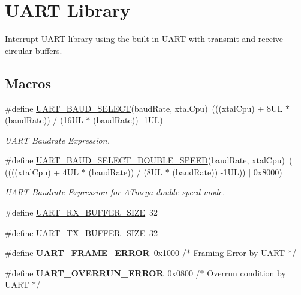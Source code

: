\hypertarget{group__pfleury__uart}{}\section{U\+A\+RT Library}
\label{group__pfleury__uart}


Interrupt U\+A\+RT library using the built-\/in U\+A\+RT with transmit and receive circular buffers.  


\subsection*{Macros}
\begin{DoxyCompactItemize}
\item 
\#define \hyperlink{group__pfleury__uart_ga367ff7b5de225ed936a63239ad4adb0b}{U\+A\+R\+T\+\_\+\+B\+A\+U\+D\+\_\+\+S\+E\+L\+E\+CT}(baud\+Rate,  xtal\+Cpu)~(((xtal\+Cpu) + 8\+U\+L $\ast$ (baud\+Rate)) / (16\+U\+L $\ast$ (baud\+Rate)) -\/1\+U\+L)
\begin{DoxyCompactList}\small\item\em U\+A\+RT Baudrate Expression. \end{DoxyCompactList}\item 
\#define \hyperlink{group__pfleury__uart_ga1a02d45130520cb651ab313e69039382}{U\+A\+R\+T\+\_\+\+B\+A\+U\+D\+\_\+\+S\+E\+L\+E\+C\+T\+\_\+\+D\+O\+U\+B\+L\+E\+\_\+\+S\+P\+E\+ED}(baud\+Rate,  xtal\+Cpu)~( ((((xtal\+Cpu) + 4\+U\+L $\ast$ (baud\+Rate)) / (8\+U\+L $\ast$ (baud\+Rate)) -\/1\+U\+L)) $\vert$ 0x8000)
\begin{DoxyCompactList}\small\item\em U\+A\+RT Baudrate Expression for A\+Tmega double speed mode. \end{DoxyCompactList}\item 
\#define \hyperlink{group__pfleury__uart_ga5bdd6772c246436bb14377095de79b31}{U\+A\+R\+T\+\_\+\+R\+X\+\_\+\+B\+U\+F\+F\+E\+R\+\_\+\+S\+I\+ZE}~32
\item 
\#define \hyperlink{group__pfleury__uart_ga05f5d709605c6317c97e4974bec3402a}{U\+A\+R\+T\+\_\+\+T\+X\+\_\+\+B\+U\+F\+F\+E\+R\+\_\+\+S\+I\+ZE}~32
\item 
\#define {\bfseries U\+A\+R\+T\+\_\+\+F\+R\+A\+M\+E\+\_\+\+E\+R\+R\+OR}~0x1000              /$\ast$ Framing Error by U\+A\+R\+T       $\ast$/\hypertarget{group__pfleury__uart_gabcdb1041d763560cd8f8e722370dfd37}{}\label{group__pfleury__uart_gabcdb1041d763560cd8f8e722370dfd37}

\item 
\#define {\bfseries U\+A\+R\+T\+\_\+\+O\+V\+E\+R\+R\+U\+N\+\_\+\+E\+R\+R\+OR}~0x0800              /$\ast$ Overrun condition by U\+A\+R\+T   $\ast$/\hypertarget{group__pfleury__uart_ga3183177e3613d8785d8cc8516931beb6}{}\label{group__pfleury__uart_ga3183177e3613d8785d8cc8516931beb6}


\end{DoxyCompactItemize}
